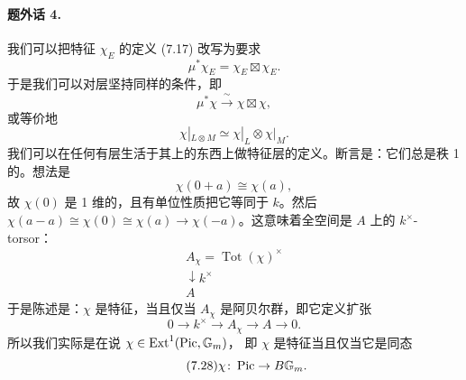 \paragraph{题外话 4.}
我们可以把特征 $\chi_E$ 的定义 (7.17) 改写为要求
\begin{equation}\tag{7.22}\label{eq:7.22}
\mu^*\chi_E=\chi_E\boxtimes\chi_E .
\end{equation}
于是我们可以对层坚持同样的条件，即
\begin{equation}\tag{7.23}\label{eq:7.23}
\mu^*\chi\xrightarrow{\ \sim\ }\chi\boxtimes\chi,
\end{equation}
或等价地
\begin{equation}\tag{7.24}\label{eq:7.24}
\chi|_{L\otimes M}\simeq\chi|_L\otimes\chi|_M .
\end{equation}
我们可以在任何有层生活于其上的东西上做特征层的定义。断言是：它们总是秩 1 的。想法是
\begin{equation}\tag{7.25}\label{eq:7.25}
\chi(0+a)\cong\chi(a),
\end{equation}
故 $\chi(0)$ 是 1 维的，且有单位性质把它等同于 $k$。然后
$\chi(a-a)\cong\chi(0)\cong\chi(a)\to\chi(-a)$。这意味着全空间是 $A$ 上的 $k^{\times}$-torsor：
\begin{equation}\tag{7.26}\label{eq:7.26}
\begin{array}{c}
A_{\chi}=\operatorname{Tot}(\chi)^{\times}\\[2pt]
\downarrow{\scriptstyle k^{\times}}\\[2pt]
A
\end{array}
\end{equation}
于是陈述是：$\chi$ 是特征，当且仅当 $A_{\chi}$ 是阿贝尔群，即它定义扩张
\begin{equation}\tag{7.27}\label{eq:7.27}
0\to k^{\times}\to A_{\chi}\to A\to 0 .
\end{equation}
所以我们实际是在说 $\chi\in\operatorname{Ext}^1(\operatorname{Pic},\mathbb{G}_m)$，
即 $\chi$ 是特征当且仅当它是同态
\begin{equation}\tag{7.28}\label{eq:7.28}
\chi\colon\operatorname{Pic}\to B\mathbb{G}_m .
\end{equation}

